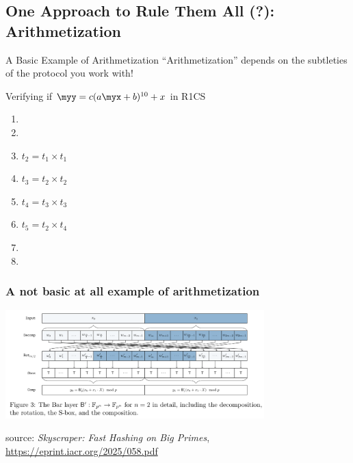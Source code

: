 \documentclass[presentation,aspectratio=1610]{beamer}
\begin{document}
\subsection{One Approach to Rule Them All (?): Arithmetization}

\begin{frame}{A Basic Example of Arithmetization}
  ``Arithmetization'' depends on the subtleties of the \alert{protocol} you work with!

  \pause
  
  \begin{exampleblock}{Verifying if $\myy = c(a \myx + b)^{10}+x$ in R1CS}
    \begin{multicols}{2}
      \begin{enumerate}
      \item {}
      \item {}
      \item $t_{2} = t_{1} \times t_{1}$
      \item $t_{3} = t_{2} \times t_{2}$
      \item $t_{4} = t_{3} \times t_{3}$
      \item $t_{5} = t_{2} \times t_{4}$
      \item {}
      \item {}
      \end{enumerate}
    \end{multicols}

  \end{exampleblock}
\end{frame}


\begin{frame}
  \frametitle{A not basic at all example of arithmetization}
  \begin{center}
    \includegraphics[width=10cm]{./figures/skyscraper}

    \vspace{1cm}

    {source: \emph{Skyscraper: Fast Hashing on Big Primes}, \url{https://eprint.iacr.org/2025/058.pdf}}
  \end{center}
\end{frame}
\end{document}
